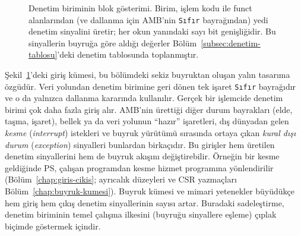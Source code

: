 \begin{figure}[htbp]
\centering
{}
\caption[Denetim biriminin blok gösterimi]{Denetim biriminin blok gösterimi. Birim, işlem kodu ile funct alanlarından (ve dallanma için AMB'nin \texttt{Sıfır} bayrağından) yedi denetim sinyalini üretir; her okun yanındaki sayı bit genişliğidir. Bu sinyallerin buyruğa göre aldığı değerler Bölüm~\ref{subsec:denetim-tablosu}'deki denetim tablosunda toplanmıştır.}
\label{fig:denetim-birimi-blok}
\end{figure}

Şekil~\ref{fig:denetim-birimi-blok}'deki giriş kümesi, bu bölümdeki sekiz buyruktan oluşan yalın tasarıma özgüdür. Veri yolundan denetim birimine geri dönen tek işaret \texttt{Sıfır} bayrağıdır ve o da yalnızca dallanma kararında kullanılır. Gerçek bir işlemcide denetim birimi çok daha fazla giriş alır. AMB'nin ürettiği diğer durum bayrakları (elde, taşma, işaret), bellek ya da veri yolunun ``hazır'' işaretleri, dış dünyadan gelen \emph{kesme} (\emph{interrupt}) istekleri ve buyruk yürütümü sırasında ortaya çıkan \emph{kural dışı durum} (\emph{exception}) sinyalleri bunlardan birkaçıdır. Bu girişler hem üretilen denetim sinyallerini hem de buyruk akışını değiştirebilir. Örneğin bir kesme geldiğinde PS, çalışan programdan kesme hizmet programına yönlendirilir (Bölüm~\ref{chap:giris-cikis}; ayrıcalık düzeyleri ve CSR yazmaçları Bölüm~\ref{chap:buyruk-kumesi}). Buyruk kümesi ve mimari yetenekler büyüdükçe hem giriş hem çıkış denetim sinyallerinin sayısı artar. Buradaki sadeleştirme, denetim biriminin temel çalışma ilkesini (buyruğu sinyallere eşleme) çıplak biçimde göstermek içindir.


